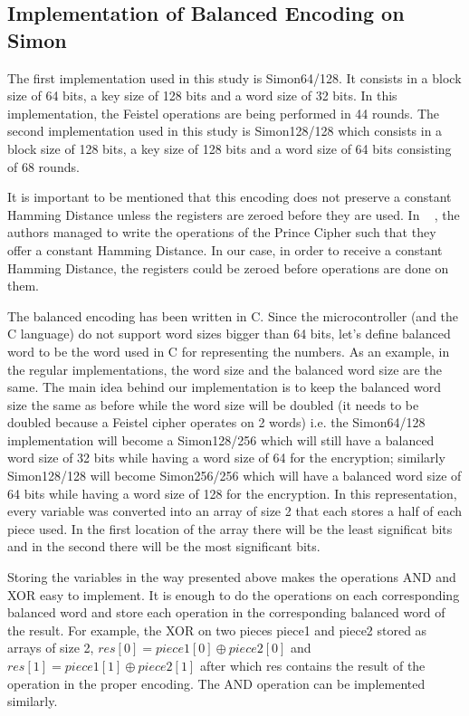 \documentclass[conference]{IEEEtran}
\begin{document}
\subsection{Implementation of Balanced Encoding on Simon}

The first implementation used in this study is Simon64/128. It consists in a block size of 64 bits, a key size of 128 bits and a word size of 32 bits. In this implementation, the Feistel operations are being performed in 44 rounds. The second implementation used in this study is Simon128/128 which consists in a block size of 128 bits, a key size of 128 bits and a word size of 64 bits consisting of 68 rounds.

It is important to be mentioned that this encoding does not preserve a constant Hamming Distance unless the registers are zeroed before they are used. In ~\cite{BEPrince} , the authors managed to write the operations of the Prince Cipher such that they offer a constant Hamming Distance. In our case, in order to receive a constant Hamming Distance, the registers could be zeroed before operations are done on them.

The balanced encoding has been written in C. Since the microcontroller (and the C language) do not support word sizes bigger than 64 bits, let's define balanced word to be the word used in C for representing the numbers. As an example, in the regular implementations, the word size and the balanced word size are the same. The main idea behind our implementation is to keep the balanced word size the same as before while the word size will be doubled (it needs to be doubled because a Feistel cipher operates on 2 words) i.e. the Simon64/128 implementation will become a Simon128/256 which will still have a balanced word size of 32 bits while having a word size of 64 for the encryption; similarly Simon128/128 will become Simon256/256 which will have a balanced word size of 64 bits while having a word size of 128 for the encryption. In this representation, every variable was converted into an array of size 2 that each stores a half of each piece used. In the first location of the array there will be the least significat bits and in the second there will be the most significant bits.

Storing the variables in the way presented above makes the operations AND and XOR easy to implement. It is enough to do the operations on each corresponding balanced word and store each operation in the corresponding balanced word of the result. For example, the XOR on two pieces piece1 and piece2 stored as arrays of size 2, $res[0] = piece1[0] \oplus piece2[0]$ and $res[1] = piece1[1] \oplus piece2[1]$ after which res contains the result of the operation in the proper encoding. The AND operation can be implemented similarly.
\end{document}
